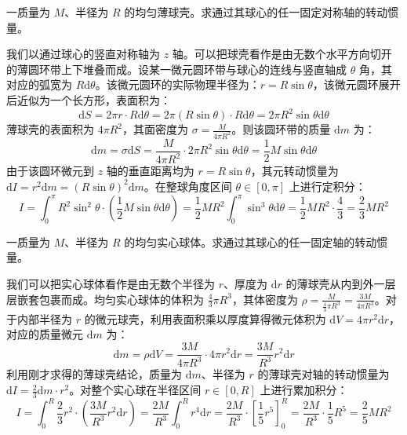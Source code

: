 \begin{exercise}
一质量为 $M$、半径为 $R$ 的均匀薄球壳。求通过其球心的任一固定对称轴的转动惯量。
\end{exercise}
\begin{solution}
我们以通过球心的竖直对称轴为 $z$ 轴。可以把球壳看作是由无数个水平方向切开的薄圆环带上下堆叠而成。设某一微元圆环带与球心的连线与竖直轴成 $\theta$ 角，其对应的弧宽为 $R\mathrm{d}\theta$。该微元圆环的实际物理半径为：$r = R\sin\theta$，该微元圆环展开后近似为一个长方形，表面积为：\[\mathrm{d}S = 2\pi r \cdot R\mathrm{d}\theta = 2\pi (R\sin\theta) \cdot R\mathrm{d}\theta = 2\pi R^2\sin\theta\mathrm{d}\theta\]
薄球壳的表面积为 $4\pi R^2$，其面密度为 $\sigma = \frac{M}{4\pi R^2}$。则该圆环带的质量 $\mathrm{d}m$ 为：
$$\mathrm{d}m = \sigma \mathrm{d}S = \frac{M}{4\pi R^2} \cdot 2\pi R^2\sin\theta\mathrm{d}\theta = \frac{1}{2}M\sin\theta\mathrm{d}\theta$$
由于该圆环微元到 $z$ 轴的垂直距离均为 $r = R\sin\theta$，其元转动惯量为 $\mathrm{d}I = r^2\mathrm{d}m = (R\sin\theta)^2\mathrm{d}m$。在整球角度区间 $\theta \in [0, \pi]$ 上进行定积分：$$I = \int_{0}^{\pi} R^2\sin^2\theta \cdot \left(\frac{1}{2}M\sin\theta\mathrm{d}\theta\right) = \frac{1}{2}MR^2 \int_{0}^{\pi} \sin^3\theta \mathrm{d}\theta= \frac{1}{2}MR^2 \cdot \frac{4}{3} = \frac{2}{3}MR^2$$
\end{solution}

\begin{exercise}
一质量为 $M$、半径为 $R$ 的均匀实心球体。求通过其球心的任一固定轴的转动惯量。
\end{exercise}
\begin{solution}
我们可以把实心球体看作是由无数个半径为 $r$、厚度为 $\mathrm{d}r$ 的薄球壳从内到外一层层嵌套包裹而成。均匀实心球体的体积为 $\frac{4}{3}\pi R^3$，其体密度为 $\rho = \frac{M}{\frac{4}{3}\pi R^3} = \frac{3M}{4\pi R^3}$。对于内部半径为 $r$ 的微元球壳，利用表面积乘以厚度算得微元体积为 $\mathrm{d}V = 4\pi r^2 \mathrm{d}r$，对应的质量微元 $\mathrm{d}m$ 为：$$\mathrm{d}m = \rho \mathrm{d}V = \frac{3M}{4\pi R^3} \cdot 4\pi r^2 \mathrm{d}r = \frac{3M}{R^3}r^2\mathrm{d}r$$利用刚才求得的薄球壳结论，质量为 $\mathrm{d}m$、半径为 $r$ 的薄球壳对轴的转动惯量为 $\mathrm{d}I = \frac{2}{3}\mathrm{d}m \cdot r^2$。对整个实心球在半径区间 $r \in [0, R]$ 上进行累加积分：$$I = \int_{0}^{R} \frac{2}{3}r^2 \cdot \left(\frac{3M}{R^3}r^2\mathrm{d}r\right) = \frac{2M}{R^3} \int_{0}^{R} r^4 \mathrm{d}r = \frac{2M}{R^3} \cdot \left[ \frac{1}{5}r^5 \right]_0^R = \frac{2M}{R^3} \cdot \frac{1}{5}R^5 = \frac{2}{5}MR^2$$
\end{solution}

